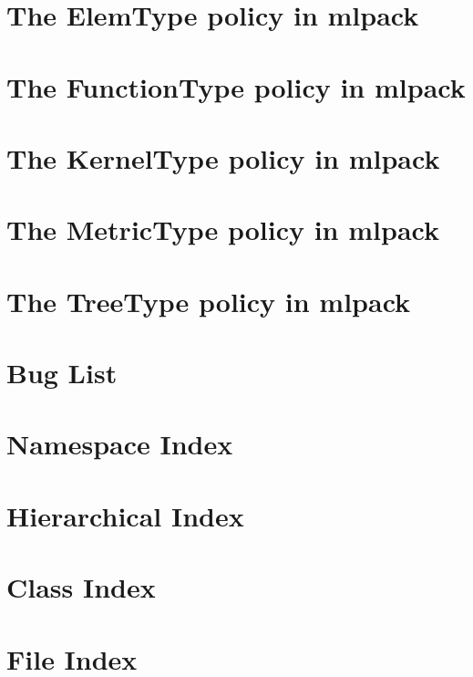 \documentclass[twoside]{book}
\newcommand{\+}{\discretionary{\mbox{\scriptsize$\hookleftarrow$}}{}{}}
\begin{document}
\chapter{The Elem\+Type policy in mlpack}
\label{elem}

\chapter{The Function\+Type policy in mlpack}
\label{function}

\chapter{The Kernel\+Type policy in mlpack}
\label{kernels}

\chapter{The Metric\+Type policy in mlpack}
\label{metrics}

\chapter{The Tree\+Type policy in mlpack}
\label{trees}

\chapter{Bug List}
\label{bug}

\chapter{Namespace Index}

\chapter{Hierarchical Index}

\chapter{Class Index}

\chapter{File Index}

\end{document}
